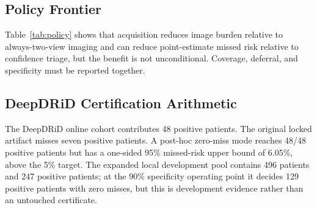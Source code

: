 \documentclass[journal]{IEEEtran}
\begin{document}
\subsection{Policy Frontier}
Table~\ref{tab:policy} shows that acquisition reduces image burden relative to always-two-view imaging and can reduce point-estimate missed risk relative to confidence triage, but the benefit is not unconditional. Coverage, deferral, and specificity must be reported together.

\begin{table}[t]
\centering
\caption{Full outer-cross-validated policy benchmark at the 5\% inner-calibration target. Policies are selected inside each fold and evaluated on held-out outer patients.}
\label{tab:policy}
\end{table}

\subsection{DeepDRiD Certification Arithmetic}
The DeepDRiD online cohort contributes 48 positive patients. The original locked artifact misses seven positive patients. A post-hoc zero-miss mode reaches 48/48 positive patients but has a one-sided 95\% missed-risk upper bound of 6.05\%, above the 5\% target. The expanded local development pool contains 496 patients and 247 positive patients; at the 90\% specificity operating point it decides 129 positive patients with zero misses, but this is development evidence rather than an untouched certificate.
\end{document}
